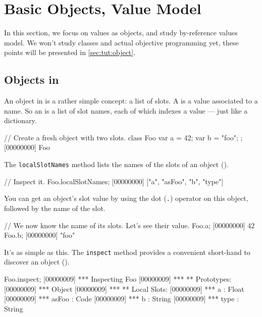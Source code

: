 
\chapter{Basic Objects, Value Model}
\label{sec:tut:value}

In this section, we focus on \us values as objects, and study \us
by-reference values model. We won't study classes and actual objective
programming yet, these points will be presented in
\autoref{sec:tut:object}.

\section{Objects in \us}
\label{sec:tut:objects}
An object in \us is a rather simple concept: a list of slots. A
 is a value associated to a name. So an  is a
list of slot names, each of which indexes a value --- just like a
dictionary.

\begin{urbiscript}[firstnumber=1]
// Create a fresh object with two slots.
class Foo
{
  var a = 42;
  var b = "foo";
};
[00000000] Foo
\end{urbiscript}

The \lstinline{localSlotNames} method lists the names of the slots of
an object ().

\begin{urbiscript}
// Inspect it.
Foo.localSlotNames;
[00000000] ["a", "asFoo", "b", "type"]
\end{urbiscript} %

You can get an object's slot value by using the dot (\lstinline{.})
operator on this object, followed by the name of the slot.

\begin{urbiscript}
// We now know the name of its slots. Let's see their value.
Foo.a;
[00000000] 42
Foo.b;
[00000000] "foo"
\end{urbiscript}

It's as simple as this.  The \lstinline|inspect| method provides a
convenient short-hand to discover an object ().

\begin{urbiscript}
Foo.inspect;
[00000009] *** Inspecting Foo
[00000009] *** ** Prototypes:
[00000009] ***   Object
[00000009] *** ** Local Slots:
[00000009] ***   a : Float
[00000009] ***   asFoo : Code
[00000009] ***   b : String
[00000009] ***   type : String
\end{urbiscript} %

